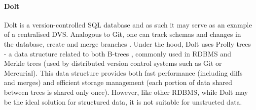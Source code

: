 \paragraph{Dolt}
Dolt is a version-controlled SQL database and as such it may serve as an example
of a centralised DVS. Analogous to Git, one can track schemas and changes in the
database, create and merge branches \cite{dolt-reproducibility}. Under the hood,
Dolt uses Prolly trees - a data structure related to both B-trees
\cite{prolly-trees}, commonly used in RDBMS and Merkle trees (used by
distributed version control systems such as Git or Mercurial)\cite{comparison}.
This data structure provides both fast performance (including diffs and merges)
and efficient storage management (each portion of data shared between trees is
shared only once). However, like other RDBMS, while Dolt may be the ideal
solution for structured data, it is not suitable for unstructed data.
\begin{comment}
    version controlled SQL DB; suitable for data stored in RDBMS (such as MySQL,
although there appears to be a postgres version as well) usage of prolly trees
(merge of B-tree (indices of RDBMS, performance of databases) and Merkle tree
(structure used in git)) = data is saved in accordance to hash (easier
identification whether file changed, better diff / merge);not suitable for
unstructured data, nor high performance; centralised; tracking of schemas and
changes in the database ;(source: github read me file);
https://docs.dolthub.com/introduction/use-cases = overview of usecases not great
for unstructured binary files; can effectively serve to replace databases;
support merging, branching and other typical git stuff;
\end{comment}